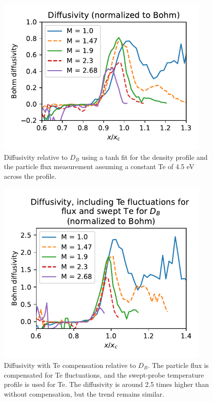 \begin{figure}
    \centering
    \includegraphics[width=300pt]{figures/extra/diffusivity_tanh-prof-fit.pdf}
    \caption[Diffusivity relative to $D_B$]{Diffusivity relative to $D_B$ using a tanh fit for the density profile and the particle flux measurement assuming a constant Te of 4.5 eV across the profile.}
    \label{fig_extra:diffusivity_tanh}
\end{figure}

\begin{figure}
    \centering
    \includegraphics[width=300pt]{figures/extra/diffusivity_Te-comp.pdf}
    \caption[Diffusivity with Te compensation relative to $D_B$]{Diffusivity with Te compensation relative to $D_B$. The particle flux is compensated for Te fluctuations, and the swept-probe temperature profile is used for Te. The diffusivity is around 2.5 times higher than without compensation, but the trend remains similar.}
    \label{fig_extra:diffusivity_Te-comp}
\end{figure}

